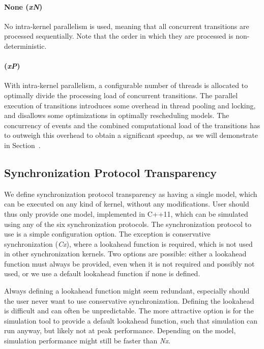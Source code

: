 \paragraph{None (\textit{xN})}
No intra-kernel parallelism is used, meaning that all concurrent transitions are processed sequentially.
Note that the order in which they are processed is non-deterministic.

\paragraph{\pSim (\textit{xP})}
With intra-kernel parallelism, a configurable number of threads is allocated to optimally divide the processing load of concurrent transitions.
The parallel execution of transitions introduces some overhead in thread pooling and locking, and disallows some optimizations in optimally rescheduling models.
The concurrency of events and the combined computational load of the transitions has to outweigh this overhead to obtain a significant speedup, as we will demonstrate in Section~\textsc{}.

\subsection{Synchronization Protocol Transparency}
We define synchronization protocol transparency as having a single model, which can be executed on any kind of kernel, without any modifications.
User should thus only provide one model, implemented in C++11, which can be simulated using any of the six synchronization protocols.
The synchronization protocol to use is a simple configuration option.
The exception is conservative synchronization (\textit{Cx}), where a lookahead function is required, which is not used in other synchronization kernels.
Two options are possible: either a lookahead function must always be provided, even when it is not required and possibly not used, or we use a default lookahead function if none is defined.

Always defining a lookahead function might seem redundant, especially should the user never want to use conservative synchronization.
Defining the lookahead is difficult and can often be unpredictable.
The more attractive option is for the simulation tool to provide a default lookahead function, such that simulation can run anyway, but likely not at peak performance.
Depending on the model, simulation performance might still be faster than \textit{Nx}. 

